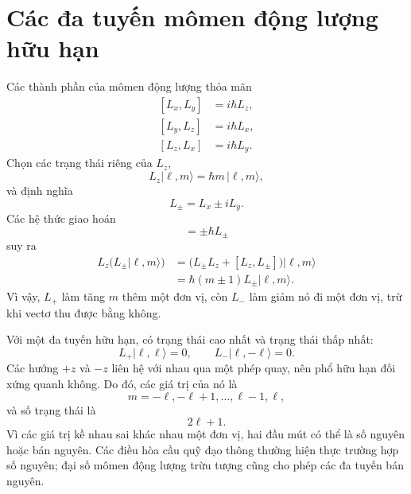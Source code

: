 \section{Các đa tuyến mômen động lượng hữu hạn}

Các thành phần của mômen động lượng thỏa mãn
\begin{equation}
\begin{aligned}
[L_x,L_y]&=i\hbar L_z,\\
[L_y,L_z]&=i\hbar L_x,\\
[L_z,L_x]&=i\hbar L_y.
\end{aligned}
\end{equation}
Chọn các trạng thái riêng của \(L_z\),
\begin{equation}
L_z|\ell,m\rangle=\hbar m\,|\ell,m\rangle,
\end{equation}
và định nghĩa
\begin{equation}
L_\pm=L_x\pm iL_y.
\end{equation}
Các hệ thức giao hoán
\begin{equation}
[L_z,L_\pm]=\pm\hbar L_\pm
\end{equation}
suy ra
\begin{align}
L_z\bigl(L_\pm|\ell,m\rangle\bigr)
&=\bigl(L_\pm L_z+[L_z,L_\pm]\bigr)|\ell,m\rangle \\
&=\hbar(m\pm1)L_\pm|\ell,m\rangle.
\end{align}
Vì vậy, \(L_+\) làm tăng \(m\) thêm một đơn vị, còn \(L_-\) làm giảm nó đi một đơn vị, trừ khi vectơ thu được bằng không.

Với một đa tuyến hữu hạn, có trạng thái cao nhất và trạng thái thấp nhất:
\begin{equation}
L_+|\ell,\ell\rangle=0,
\qquad
L_-|\ell,-\ell\rangle=0.
\end{equation}
Các hướng \(+z\) và \(-z\) liên hệ với nhau qua một phép quay, nên phổ hữu hạn đối xứng quanh không. Do đó, các giá trị của nó là
\begin{equation}
m=-\ell,-\ell+1,\ldots,\ell-1,\ell,
\end{equation}
và số trạng thái là
\begin{equation}
2\ell+1.
\end{equation}
Vì các giá trị kề nhau sai khác nhau một đơn vị, hai đầu mút có thể là số nguyên hoặc bán nguyên. Các điều hòa cầu quỹ đạo thông thường hiện thực trường hợp số nguyên; đại số mômen động lượng trừu tượng cũng cho phép các đa tuyến bán nguyên.

\begin{classroomqa}\end{classroomqa}

